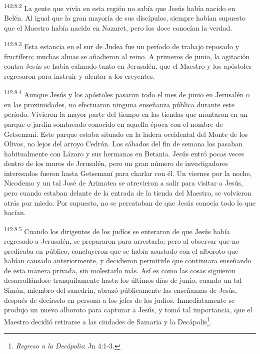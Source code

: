 \par 
\textsuperscript{142:8.2} La gente que vivía en esta región no sabía que Jesús había nacido en Belén. Al igual que la gran mayoría de sus discípulos, siempre habían supuesto que el Maestro había nacido en Nazaret, pero los doce conocían la verdad.

\par 
\textsuperscript{142:8.3} Esta estancia en el sur de Judea fue un período de trabajo reposado y fructífero; muchas almas se añadieron al reino. A primeros de junio, la agitación contra Jesús se había calmado tanto en Jerusalén, que el Maestro y los apóstoles regresaron para instruir y alentar a los creyentes.

\par 
\textsuperscript{142:8.4} Aunque Jesús y los apóstoles pasaron todo el mes de junio en Jerusalén o en las proximidades, no efectuaron ninguna enseñanza pública durante este período. Vivieron la mayor parte del tiempo en las tiendas que montaron en un parque o jardín sombreado conocido en aquella época con el nombre de Getsemaní. Este parque estaba situado en la ladera occidental del Monte de los Olivos, no lejos del arroyo Cedrón. Los sábados del fin de semana los pasaban habitualmente con Lázaro y sus hermanas en Betania. Jesús entró pocas veces dentro de los muros de Jerusalén, pero un gran número de investigadores interesados fueron hasta Getsemaní para charlar con él. Un viernes por la noche, Nicodemo y un tal José de Arimatea se atrevieron a salir para visitar a Jesús, pero cuando estaban delante de la entrada de la tienda del Maestro, se volvieron atrás por miedo. Por supuesto, no se percataban de que Jesús conocía todo lo que hacían.

\par 
\textsuperscript{142:8.5} Cuando los dirigentes de los judíos se enteraron de que Jesús había regresado a Jerusalén, se prepararon para arrestarlo; pero al observar que no predicaba en público, concluyeron que se había asustado con el alboroto que habían causado anteriormente, y decidieron permitirle que continuara enseñando de esta manera privada, sin molestarlo más. Así es como las cosas siguieron desarrollándose tranquilamente hasta los últimos días de junio, cuando un tal Simón, miembro del sanedrín, abrazó públicamente las enseñanzas de Jesús, después de decírselo en persona a los jefes de los judíos. Inmediatamente se produjo un nuevo alboroto para capturar a Jesús, y tomó tal importancia, que el Maestro decidió retirarse a las ciudades de Samaria y la Decápolis\footnote{\textit{Regreso a la Decápolis}: Jn 4:1-3.}.